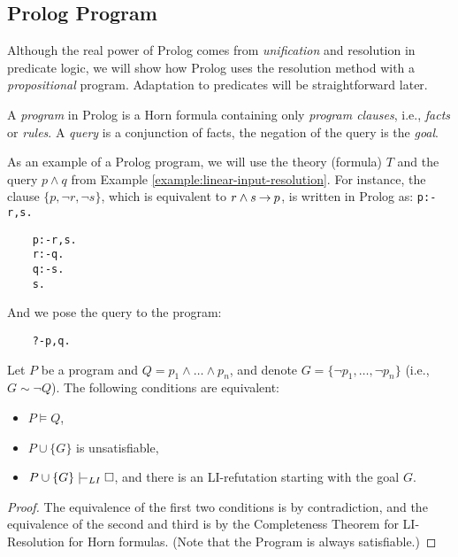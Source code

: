 
\subsection{Prolog Program}

Although the real power of Prolog comes from \emph{unification} and resolution in predicate logic, we will show how Prolog uses the resolution method with a \emph{propositional} program. Adaptation to predicates will be straightforward later.

A \emph{program} in Prolog is a Horn formula containing only \emph{program clauses}, i.e., \emph{facts} or \emph{rules}. A \emph{query} is a conjunction of facts, the negation of the query is the \emph{goal}.

\begin{example}
As an example of a Prolog program, we will use the theory (formula) $T$ and the query $p\land q$ from Example \ref{example:linear-input-resolution}. For instance, the clause $\{p,\neg r,\neg s\}$, which is equivalent to $r\land s\mathbin{\rightarrow} p$, is written in Prolog as: \texttt{p:-r,s.}
\begin{verbatim}
    p:-r,s.
    r:-q.
    q:-s.
    s.    
\end{verbatim}
And we pose the query to the program:
\begin{verbatim}
    ?-p,q.    
\end{verbatim}
\end{example}

\begin{corollary}\label{corollary:propositional-prolog}
    Let $P$ be a program and $Q=p_1\land\dots\land p_n$, and denote $G=\{\neg p_1,\dots,\neg p_n\}$ (i.e., $G\sim \neg Q$). The following conditions are equivalent:
    \begin{itemize}
        \item $P\models Q$,
        \item $P\cup\{G\}$ is unsatisfiable,
        \item $P\cup\{G\}\proves_{LI}\square$, and there is an LI-refutation starting with the goal $G$.
    \end{itemize}
\end{corollary}
\begin{proof}
    The equivalence of the first two conditions is by contradiction, and the equivalence of the second and third is by the Completeness Theorem for LI-Resolution for Horn formulas. (Note that the Program is always satisfiable.)
\end{proof}
